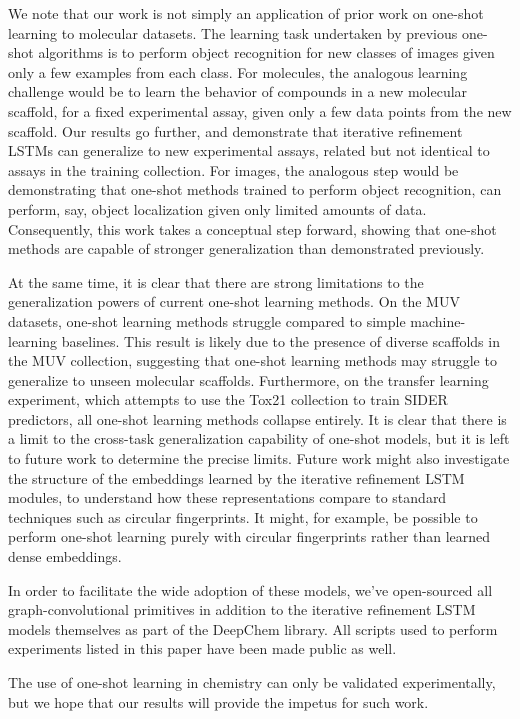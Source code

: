 \documentclass[journal=jacsat,manuscript=article]{achemso}
\begin{document}
We note that our work is not simply an application of prior work on one-shot learning to molecular datasets. The learning task undertaken by previous one-shot algorithms \cite{vinyals2016matching} is to perform object recognition for new classes of images given only a few examples from each class. For molecules, the analogous learning challenge would be to learn the behavior of compounds in a new molecular scaffold, for a fixed experimental assay, given only a few data points from the new scaffold. Our results go further, and demonstrate that iterative refinement LSTMs can generalize to new experimental assays, related but not identical to assays in the training collection. For images, the analogous step would be demonstrating that one-shot methods trained to perform object recognition, can perform, say, object localization given only limited amounts of data. Consequently, this work takes a conceptual step forward, showing that one-shot methods are capable of stronger generalization than demonstrated previously.

At the same time, it is clear that there are strong limitations to the generalization powers of current one-shot learning methods. On the MUV datasets, one-shot learning methods struggle compared to simple machine-learning baselines. This result is likely due to the presence of diverse scaffolds in the MUV collection, suggesting that one-shot learning methods may struggle to generalize to unseen molecular scaffolds. Furthermore, on the transfer learning experiment, which attempts to use the Tox21 collection to train SIDER predictors, all one-shot learning methods collapse entirely. It is clear that there is a limit to the cross-task generalization capability of one-shot models, but it is left to future work to determine the precise limits. Future work might also investigate the structure of the embeddings learned by the iterative refinement LSTM modules, to understand how these representations compare to standard techniques such as circular fingerprints. It might, for example, be possible to perform one-shot learning purely with circular fingerprints rather than learned dense embeddings.

In order to facilitate the wide adoption of these models, we've open-sourced all graph-convolutional primitives in addition to the iterative refinement LSTM models themselves as part of the DeepChem library. All scripts used to perform experiments listed in this paper have been made public as well.

The use of one-shot learning in chemistry can only be validated experimentally, but we hope that our results will provide the impetus for such work.
\end{document}
